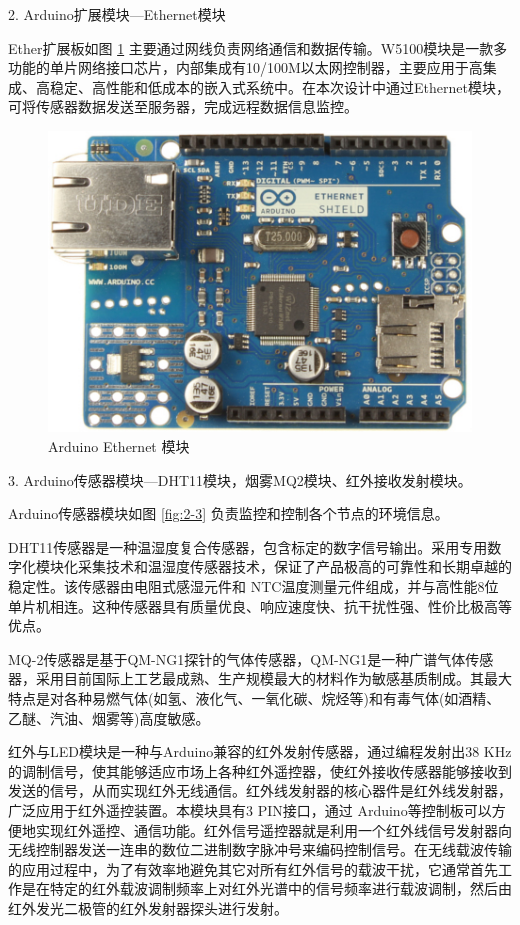 2. Arduino扩展模块---Ethernet模块

Ether扩展板如图 \ref{fig:2-2} 主要通过网线负责网络通信和数据传输。W5100模块是一款多功能的单片网络接口芯片，内部集成有10/100M以太网控制器，主要应用于高集成、高稳定、高性能和低成本的嵌入式系统中。在本次设计中通过Ethernet模块，可将传感器数据发送至服务器，完成远程数据信息监控。

\begin{figure}[htbp]
	\centering
	\includegraphics[width=0.85\linewidth]{figure/2-2}
	\caption{Arduino Ethernet 模块}
	\label{fig:2-2}
\end{figure}

3. Arduino传感器模块---DHT11模块，烟雾MQ2模块、红外接收发射模块。

Arduino传感器模块如图 \ref{fig:2-3} 负责监控和控制各个节点的环境信息。

DHT11传感器是一种温湿度复合传感器，包含标定的数字信号输出。采用专用数字化模块化采集技术和温湿度传感器技术，保证了产品极高的可靠性和长期卓越的稳定性。该传感器由电阻式感湿元件和 NTC温度测量元件组成，并与高性能8位单片机相连。这种传感器具有质量优良、响应速度快、抗干扰性强、性价比极高等优点。

MQ-2传感器是基于QM-NG1探针的气体传感器，QM-NG1是一种广谱气体传感器，采用目前国际上工艺最成熟、生产规模最大的材料作为敏感基质制成。其最大特点是对各种易燃气体(如氢、液化气、一氧化碳、烷烃等)和有毒气体(如酒精、乙醚、汽油、烟雾等)高度敏感。

红外与LED模块是一种与Arduino兼容的红外发射传感器，通过编程发射出38 KHz的调制信号，使其能够适应市场上各种红外遥控器，使红外接收传感器能够接收到发送的信号，从而实现红外无线通信。红外线发射器的核心器件是红外线发射器，广泛应用于红外遥控装置。本模块具有3 PIN接口，通过 Arduino等控制板可以方便地实现红外遥控、通信功能。红外信号遥控器就是利用一个红外线信号发射器向无线控制器发送一连串的数位二进制数字脉冲号来编码控制信号。在无线载波传输的应用过程中，为了有效率地避免其它对所有红外信号的载波干扰，它通常首先工作是在特定的红外载波调制频率上对红外光谱中的信号频率进行载波调制，然后由红外发光二极管的红外发射器探头进行发射。

